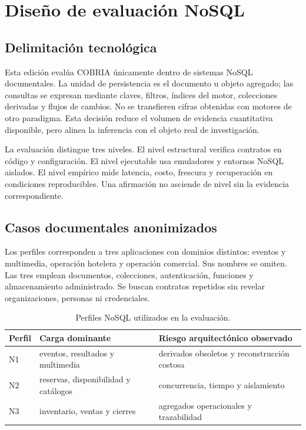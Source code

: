 \chapter{Diseño de evaluación NoSQL}

\section{Delimitación tecnológica}

Esta edición evalúa COBRIA únicamente dentro de sistemas NoSQL documentales. La unidad
de persistencia es el documento u objeto agregado; las consultas se expresan mediante
claves, filtros, índices del motor, colecciones derivadas y flujos de cambios. No se
transfieren cifras obtenidas con motores de otro paradigma. Esta decisión reduce el
volumen de evidencia cuantitativa disponible, pero alinea la inferencia con el objeto
real de investigación.

La evaluación distingue tres niveles. El nivel estructural verifica contratos en código
y configuración. El nivel ejecutable usa emuladores y entornos NoSQL aislados. El nivel
empírico mide latencia, costo, frescura y recuperación en condiciones reproducibles.
Una afirmación no asciende de nivel sin la evidencia correspondiente.

\section{Casos documentales anonimizados}

\COBRIAPerfilesCientificos

Los perfiles corresponden a tres aplicaciones con dominios distintos: eventos y multimedia,
operación hotelera y operación comercial. Sus nombres se omiten. Las tres emplean
documentos, colecciones, autenticación, funciones y almacenamiento administrado. Se
buscan contratos repetidos sin revelar organizaciones, personas ni credenciales.

\begin{table}[H]
\centering
\caption{Perfiles NoSQL utilizados en la evaluación.}
\begin{tabularx}{\textwidth}{p{2.4cm}X X}
\toprule
Perfil & Carga dominante & Riesgo arquitectónico observado\\
\midrule
N1 & eventos, resultados y multimedia & derivados obsoletos y reconstrucción costosa\\
N2 & reservas, disponibilidad y catálogos & concurrencia, tiempo y aislamiento\\
N3 & inventario, ventas y cierres & agregados operacionales y trazabilidad\\
\bottomrule
\end{tabularx}
\end{table}

